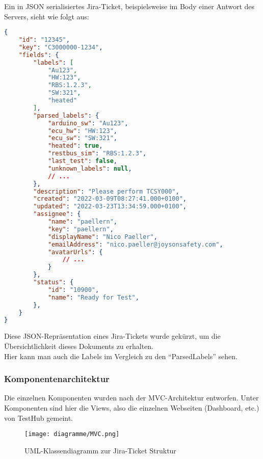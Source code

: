 Ein in \gls{JSON} serialisiertes Jira-Ticket, beispielsweise im Body einer Antwort
des Servers, sieht wie folgt aus:

\begin{lstlisting}[caption=gekürzte beispielhafte JSON Repräsentation eines Jira-Tickets,language=json]
{
    "id": "12345",
    "key": "C3000000-1234",
    "fields": {
        "labels": [
            "Au123",
            "HW:123",
            "RBS:1.2.3",
            "SW:321",
            "heated"
        ],
        "parsed_labels": {
            "arduino_sw": "Au123",
            "ecu_hw": "HW:123",
            "ecu_sw": "SW:321",
            "heated": true,
            "restbus_sim": "RBS:1.2.3",
            "last_test": false,
            "unknown_labels": null,
            // ...
        },
        "description": "Please perform TCSY000",
        "created": "2022-03-09T08:27:41.000+0100",
        "updated": "2022-03-23T13:34:59.000+0100",
        "assignee": {
            "name": "paellern",
            "key": "paellern",
            "displayName": "Nico Paeller",
            "emailAddress": "nico.paeller@joysonsafety.com",
            "avatarUrls": {
                // ...
            }
        },
        "status": {
            "id": "10900",
            "name": "Ready for Test",
        },
    }
}
\end{lstlisting}

Diese \gls{JSON}-Repräsentation eines Jira-Tickets wurde gekürzt, um die Übersichtlichkeit
dieses Dokuments zu erhalten. \\

Hier kann man auch die Labels im Vergleich zu den
``ParsedLabels'' sehen.

\subsubsection{Komponentenarchitektur}
Die einzelnen Komponenten wurden nach der \gls{MVC}-Architektur entworfen. Unter
Komponenten sind hier die Views, also die einzelnen Webseiten (Dashboard, etc.) 
von TestHub gemeint.

\begin{figure}[H]
    \texttt{[image: diagramme/MVC.png]}
    \caption{UML-Klassendiagramm zur Jira-Ticket Struktur}\label{fig:classes}
\end{figure}

